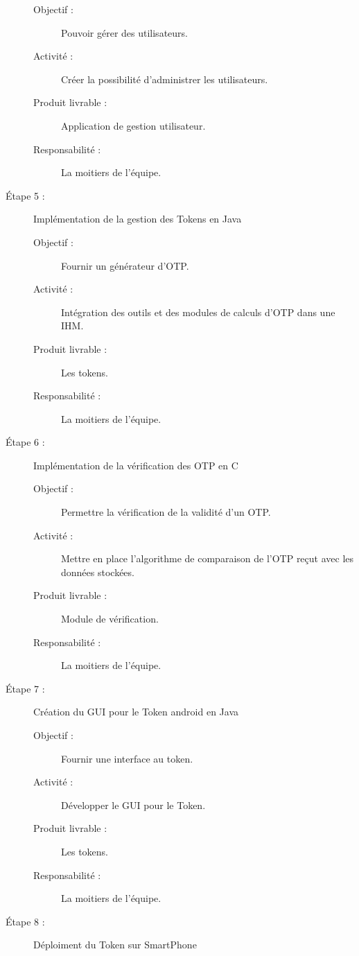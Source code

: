 \documentclass{../../res/univ-projet}
\begin{document}
\begin{description}
		    \begin{description}
		        \item [Objectif :] Pouvoir gérer des utilisateurs.
		        \item [Activité :] Créer la possibilité d'administrer les utilisateurs.
		        \item [Produit livrable :] Application de gestion utilisateur.
		        \item [Responsabilité :] La moitiers de l'équipe.
		    \end{description}
	    \item [Étape 5 :] Implémentation de la gestion des Tokens en Java
		    \begin{description}
		        \item [Objectif :] Fournir un générateur d'OTP.
		        \item [Activité :] Intégration des outils et des modules de calculs d'OTP dans une IHM.
		        \item [Produit livrable :] Les tokens.
		        \item [Responsabilité :]  La moitiers de l'équipe.
		    \end{description}
	    \item [Étape 6 :] Implémentation de la vérification des OTP en C
		    \begin{description}
		        \item [Objectif :] Permettre la vérification de la validité d'un OTP.
		        \item [Activité :] Mettre en place l'algorithme de comparaison de l'OTP reçut avec les données stockées.
		        \item [Produit livrable :] Module de vérification.
		        \item [Responsabilité :] La moitiers de l'équipe.
	            \end{description}
	    \item [Étape 7 :] Création du GUI pour le Token android en Java
		    \begin{description}
		        \item [Objectif :] Fournir une interface au token.
		        \item [Activité :] Développer le GUI pour le Token.
		        \item [Produit livrable :] Les tokens.
		        \item [Responsabilité :]  La moitiers de l'équipe.
		    \end{description}
	    \item [Étape 8 :] Déploiment du Token sur SmartPhone

\end{description}
\end{document}

